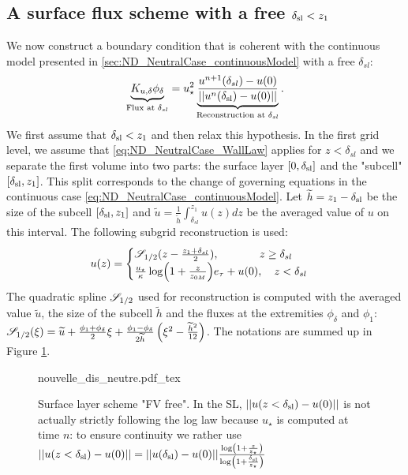 \subsection{A surface flux scheme with a free $\delta_{\rm sl}<z_1$}
\label{sec:ND_NeutralCase_newSFscheme}
We now construct a boundary condition that is coherent
with the continuous model presented in
\ref{sec:ND_NeutralCase_continuousModel}
with a free $\delta_{sl}$:
\begin{equation}
	\label{eq:ND_NeutralCase_bottomCondFVFree}
	\underbrace{K_{u,\delta} \phi_{\delta}}_{\text{Flux at }
	\delta_{sl}}
	= u_\star^2 
	  \underbrace{\frac{u^{n+1}(\delta_{sl})-u(0)}
		{||u^n(\delta_{\rm sl})-u(0)||}}_{
			\text{Reconstruction at } \delta_{sl}
		}.
\end{equation}
We first assume
that $\delta_{\rm sl} < z_1$ and then relax this hypothesis.
In the first grid level, we assume that
\eqref{eq:ND_NeutralCase_WallLaw} applies for $z<\delta_{sl}$
and we separate the 
first volume into two parts: the surface layer $[0,\delta_{\rm sl}]$ and the "subcell" $[\delta_{\rm sl}, z_1]$.
This split corresponds to the change of governing equations
in the continuous case \eqref{eq:ND_NeutralCase_continuousModel}.
Let $\widetilde{h} = z_1 - \delta_{\rm sl}$  be the size of the subcell $[\delta_{\rm sl}, z_1]$
and $\widetilde{u} = \frac{1}{\widetilde{h}}\int_{\delta_{sl}}^{z_1}
u(z)dz$ be the averaged value of $u$ on this interval.
The following subgrid reconstruction is used:
\begin{equation}
	\label{eq:ND_NeutralCase_fullReconstruction}
	u(z) = \begin{cases}
		{\cal S}_{1/2}(z - \frac{z_1 + \delta_{sl}}{2}),
		~~~~~~~~~~~ z \geq \delta_{sl}
		\\
		\frac{{u_\star}}{\kappa}
		\log(1+\frac{z}{z_{0M}})e_\tau + u(0),
		~~~ z < \delta_{sl}
	\end{cases}
\end{equation}
The quadratic spline ${\cal S}_{1/2}$ used for reconstruction
is computed with the averaged value $\widetilde{u}$, the
size of the subcell $\widetilde{h}$ and the fluxes at the
extremities $\phi_{\delta}$ and $\phi_1$:
${\cal S}_{1/2}(\xi) = 
\widetilde{u} + \frac{\phi_{1} + \phi_{\delta}}{2} \xi
+ \frac{\phi_{1} - \phi_{\delta}}{2\widetilde{h}}
\left(\xi^2 - \frac{\widetilde{h}^2}{12}\right)$.
The notations are summed up in Figure
\ref{fig:ND_NeutralCase_nouvelle_dis_neutre}.
\begin{figure}
	{nouvelle_dis_neutre.pdf_tex}
	\caption{ Surface layer scheme "FV free".
	In the SL, $||u(z<\delta_{\rm sl})-u(0)||$ is not
	actually strictly following the log law because
	$u_\star$ is computed at time $n$: to ensure continuity
	we rather use
	$||u(z<\delta_{\rm sl})-u(0)|| = 
	||u(\delta_{\rm sl})-u(0)|| \frac{\log(
	1+\frac{z}{z_\star})}{\log(1+\frac{\delta_{\rm sl}}{z_\star})}$
	}
	\label{fig:ND_NeutralCase_nouvelle_dis_neutre}
\end{figure}
